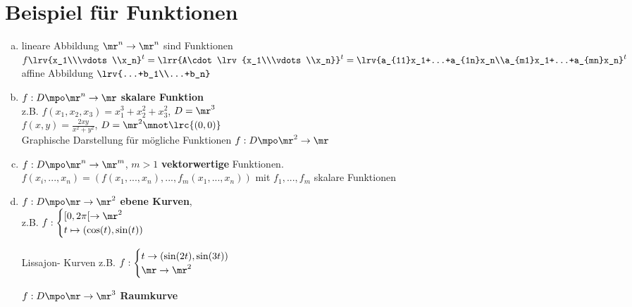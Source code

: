 \section{Beispiel für Funktionen}
	\begin{enumerate}[a)]
		\item  lineare Abbildung $ \mr^n\rightarrow\mr^n $ sind Funktionen $ f\lrv{x_1\\\vdots\\x_n}^t=\lrr{A\cdot\lrv{x_1\\\vdots\\x_n}}^t=\lrv{a_{11}x_1+...+a_{1n}x_n\\a_{m1}x_1+...+a_{mn}x_n}^t$\\
		affine Abbildung $ \lrv{...+b_1\\...+b_n} $
		\item  $ f:D\mpo\mr^n\rightarrow\mr $ \textbf{skalare Funktion}\\
		z.B. $ f(x_1,x_2,x_3)=x_1^3+x_2^2+x_3^2 $, $ D=\mr^3 $\\
		$ f(x,y)=\frac{2xy}{x^2+y^2} $, $ D=\mr^2\mnot\lrc{(0,0)} $\\
		Graphische Darstellung für mögliche Funktionen $ f:D\mpo\mr^2\rightarrow\mr $
		
		
		\item  $ f:D\mpo\mr^n\rightarrow\mr^m $, $ m>1 $ \textbf{vektorwertige} Funktionen.\\
		$ f(x_i,...,x_n)=(f(x_1,...,x_n),...,f_m(x_1,...,x_n)) $ mit $ f_1,...,f_m $ skalare Funktionen
		
		\item $ f:D\mpo\mr\rightarrow\mr^2 $ \textbf{ebene Kurven},\\
		z.B. $ f:\begin{cases}[0,2\pi[\rightarrow\mr^2\\t\mapsto(\cos(t),\sin(t))\end{cases} $
		
		
		Lissajon- Kurven z.B. $ f:\begin{cases}t\rightarrow(\sin(2t),\sin(3t))\\\mr\rightarrow\mr^2\end{cases} $
		
		$ f:D\mpo\mr\rightarrow\mr^3 $ \textbf{Raumkurve}
	\end{enumerate}

